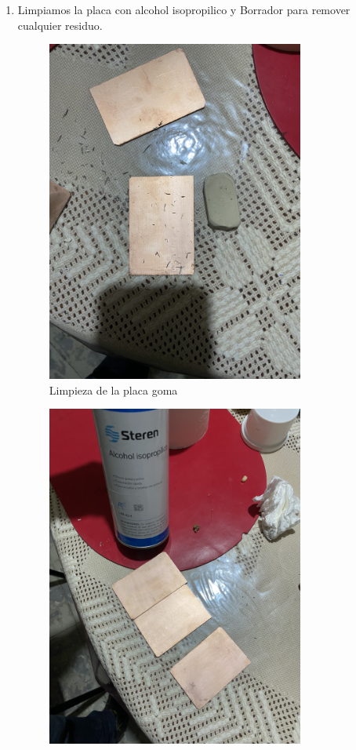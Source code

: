 \documentclass[12pt]{report}
\begin{document}
\begin{enumerate}
\begin{figure}[H]
        \end{figure}
  \item Limpiamos la placa con alcohol isopropilico y Borrador para remover cualquier residuo.
        \begin{figure}[H]
            \centering
            \includegraphics[width=0.8\textwidth]{screenshots/img2.jpg}
            \caption{Limpieza de la placa goma}
        \end{figure}
        \begin{figure}[H]
            \centering
            \includegraphics[width=0.8\textwidth]{screenshots/img3.jpg}

\end{figure}
\end{enumerate}
\end{document}
